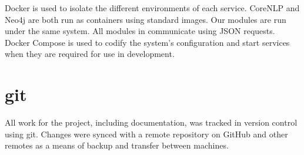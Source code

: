     Docker is used to isolate the different environments of each service. CoreNLP and Neo4j are both run as containers using standard images. Our modules are run under the same system. All modules in communicate using JSON requests. Docker Compose is used to codify the system's configuration and start services when they are required for use in development.

  \tocless\section{git}
    All work for the project, including documentation, was tracked in version control using git. Changes were synced with a remote repository on GitHub and other remotes as a means of backup and transfer between machines.
